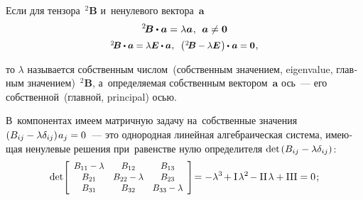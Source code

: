 \begin{otherlanguage}{russian}

Если для тензора~${^2\!\bm{B}}$ и~ненулевого вектора~${\bm{a}}$
\nopagebreak\vspace{0.1em}\begin{equation}\label{eigenvalues:eq}
^2\!\bm{B} \dotp \bm{a} = \lambda \bm{a} \hspace{0.1ex},\:\: \bm{a} \neq \bm{0}
\end{equation}
\vspace{-1.2em}\[
\scalebox{0.92}[0.92]{${^2\!\bm{B}} \dotp \bm{a} = \lambda \bm{E} \dotp \bm{a} \hspace{0.1ex},\;\;
\left(\hspace{0.1ex}
{^2\!\bm{B} - \lambda \bm{E}}
\hspace{0.2ex}\right) \hspace{-0.1ex} \dotp \hspace{0.1ex} \bm{a} = \bm{0}$} \hspace{0.1ex},
\]

\vspace{-0.64em} \noindent то ${\lambda}$ называется собственным числом~(собственным значением, eigenvalue, главным значением)~${^2\!\bm{B}}$, а~определяемая собственным вектором~${\bm{a}}$ ось~--- его собственной~(главной, principal) осью.

В~компонентах имеем матричную задачу на~собственные значения ${(B_{ij} - \lambda \delta_{ij}) \hspace{0.2ex} a_j = 0}$~--- это однородная линейная алгебраическая система, имеющая ненулевые решения при~равенстве нулю определителя ${\operatorname{det}\hspace{0.32ex} (B_{ij} - \lambda \delta_{ij})}$:
\nopagebreak\vspace{0.1em}\begin{equation}\label{chardetequation}
\operatorname{det}\! \scalebox{0.9}[0.92]{$\left[
\begin{array}{ccc}
B_{11} - \lambda & B_{12} & B_{13} \\
B_{21} & B_{22} - \lambda & B_{23} \\
B_{31} & B_{32} & B_{33} - \lambda
\end{array}
\right]$} \!= - \lambda^3 \hspace{-0.25ex} + \mathrm{I}\hspace{.25ex} \lambda^2 \hspace{-0.25ex} - \mathrm{II}\hspace{.25ex} \lambda + \mathrm{III} = 0 \hspace{.2ex} ;
\end{equation}


\end{otherlanguage}
